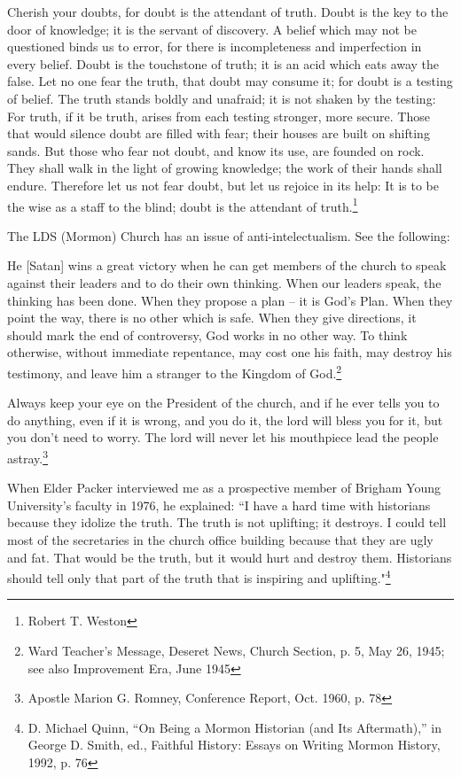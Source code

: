 \begin{displayquote}
Cherish your doubts, for doubt is the attendant of truth. Doubt is the key to the
door of knowledge; it is the servant of discovery. A belief which may not be
questioned binds us to error, for there is incompleteness and imperfection in every
belief. Doubt is the touchstone of truth; it is an acid which eats away the false.
Let no one fear the truth, that doubt may consume it; for doubt is a testing of
belief. The truth stands boldly and unafraid; it is not shaken by the testing:
For truth, if it be truth, arises from each testing stronger, more secure. Those
that would silence doubt are filled with fear; their houses are built on shifting
sands. But those who fear not doubt, and know its use, are founded on rock.
They shall walk in the light of growing knowledge; the work of their hands shall
endure. Therefore let us not fear doubt, but let us rejoice in its help: It is to be
the wise as a staff to the blind; doubt is the attendant of truth.\footnote{
Robert T. Weston}
\end{displayquote}

The LDS (Mormon) Church has an issue of anti-intelectualism. See the following:

\begin{displayquote}
He [Satan] wins a great victory when he can get members of the church to speak
against their leaders and to do their own thinking. When our leaders speak, the
thinking has been done. When they propose a plan – it is God's Plan. When they point
the way, there is no other which is safe. When they give directions, it should mark
the end of controversy, God works in no other way. To think otherwise, without 
immediate repentance, may cost one his faith, may destroy his testimony, and leave 
him a stranger to the Kingdom of God.\footnote{
Ward Teacher's Message, Deseret News, Church Section, p. 5, May 26, 1945; see also 
Improvement Era, June 1945
}
\end{displayquote}

\begin{displayquote}
Always keep your eye on the President of the church, and if he ever tells you to do
anything, even if it is wrong, and you do it, the lord will bless you for it, but you
don't need to worry. The lord will never let his mouthpiece lead the people
astray.\footnote{Apostle Marion G. Romney, Conference Report, Oct. 1960, p. 78}
\end{displayquote}

\begin{displayquote}
When Elder Packer interviewed me as a prospective member of Brigham Young
University's faculty in 1976, he explained: ``I have a hard time with historians
because they idolize the truth. The truth is not uplifting; it destroys. I could tell
most of the secretaries in the church office building because that they are ugly and
fat. That would be the truth, but it would hurt and destroy them. Historians should
tell only that part of the truth that is inspiring and uplifting."\footnote{
D. Michael Quinn, “On Being a Mormon Historian (and Its Aftermath),” in George D. 
Smith, ed., Faithful History: Essays on Writing Mormon History, 1992, p. 76
}
\end{displayquote}

